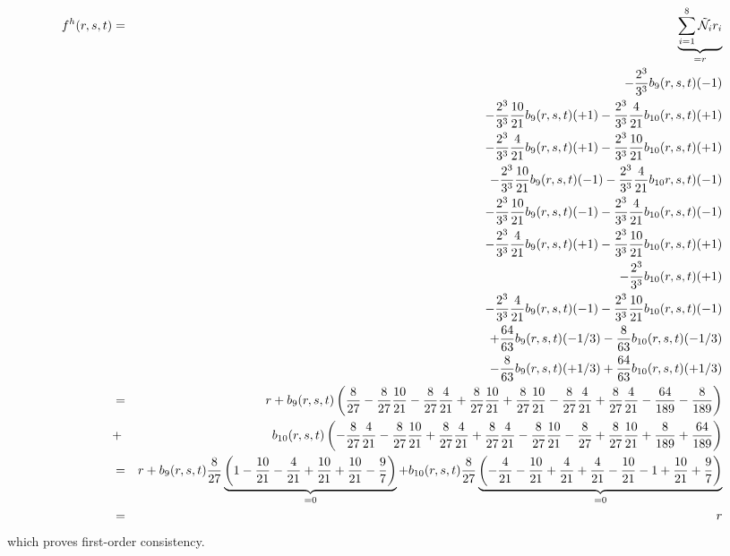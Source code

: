 \begin{eqnarray}
f^h(r,s,t)
&=& \underbrace{\sum_{i=1}^8 \tilde{{\mathcal{N}}}_i r_i }_{=r} \nonumber\\
&& -\frac{2^3}{3^3}b_9(r,s,t) (-1)  \nonumber\\
&& -\frac{2^3}{3^3}\frac{10}{21} b_9(r,s,t) (+1) - \frac{2^3}{3^3}\frac{4}{21} b_{10}(r,s,t) (+1)  \nonumber\\
&& -\frac{2^3}{3^3}\frac{4}{21} b_9(r,s,t)  (+1)-\frac{2^3}{3^3}\frac{10}{21} b_{10}(r,s,t) (+1)     \nonumber\\
&&-\frac{2^3}{3^3}\frac{10}{21} b_{9}(r,s,t) (-1) -\frac{2^3}{3^3}\frac{4}{21} b_{10}r,s,t) (-1)     \nonumber\\
&&- \frac{2^3}{3^3}\frac{10}{21} b_{9}(r,s,t) (-1) -\frac{2^3}{3^3}\frac{4}{21} b_{10}(r,s,t)  (-1)    \nonumber\\
&& -\frac{2^3}{3^3}\frac{4}{21} b_9(r,s,t) (+1) -\frac{2^3}{3^3}\frac{10}{21} b_{10}(r,s,t) (+1)  \nonumber\\
&& - \frac{2^3}{3^3}b_{10}(r,s,t) (+1)     \nonumber\\
&&-\frac{2^3}{3^3}\frac{4}{21} b_9(r,s,t) (-1) -\frac{2^3}{3^3}\frac{10}{21} b_{10}(r,s,t) (-1)      \nonumber\\
&& +  \frac{64}{63}b_9(r,s,t)(-1/3) -\frac{8}{63} b_{10}(r,s,t) (-1/3)     \nonumber\\
&&  -\frac{8}{63} b_{9}(r,s,t)(+1/3)  + \frac{64}{63}b_{10}(r,s,t)   (+1/3) \nonumber\\
&=& r + 
b_9(r,s,t) \left( 
\frac{8}{27} -\frac{8}{27}\frac{10}{21} -\frac{8}{27}\frac{4}{21} 
+\frac{8}{27}\frac{10}{21}
+\frac{8}{27}\frac{10}{21} 
-\frac{8}{27}\frac{4}{21}  
+\frac{8}{27}\frac{4}{21}
-\frac{64}{189}-\frac{8}{189}
\right) \nonumber\\ 
&+& b_{10}(r,s,t) \left(
-\frac{8}{27} \frac{4}{21} 
-\frac{8}{27}\frac{10}{21} 
+ \frac{8}{27}\frac{4}{21} 
+ \frac{8}{27}\frac{4}{21} 
-\frac{8}{27}\frac{10}{21} 
-\frac{8}{27}
+\frac{8}{27}\frac{10}{21}
+\frac{8}{189}
+\frac{64}{189}
\right) \nonumber\\
&=& r +  
b_9(r,s,t) \frac{8}{27} 
\underbrace{\left( 1 - \frac{10}{21} - \frac{4}{21} + \frac{10}{21} + \frac{10}{21} 
-\frac{9}{7} \right)}_{=0}
+b_{10}(r,s,t) \frac{8}{27} 
\underbrace{\left( 
- \frac{4}{21} -\frac{10}{21} + \frac{4}{21} + \frac{4}{21} - \frac{10}{21} -1 +  \frac{10}{21} + \frac{9}{7}
\right)}_{=0} \nonumber\\
&=& r 
\end{eqnarray}
which proves first-order consistency.





